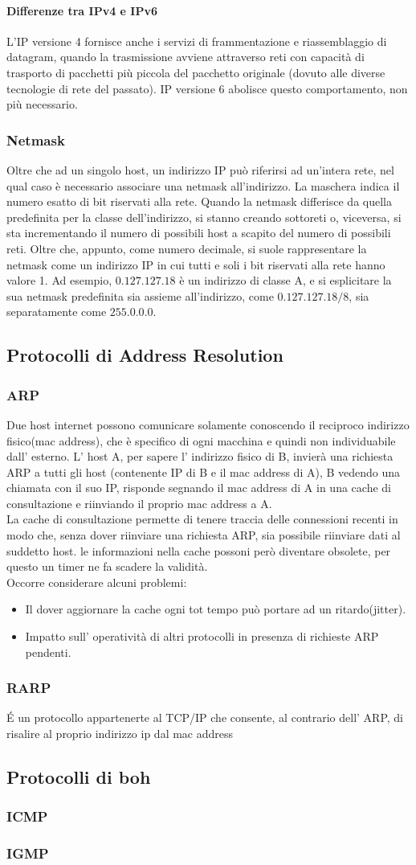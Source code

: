 \documentclass[a4paper,11pt]{article}
\def\sub#1{\subsection{#1}\label{#1}}
\def\subsub#1{\subsubsection{#1}\label{#1}}
\begin{document}
\paragraph{Differenze tra IPv4 e IPv6}
L’IP versione 4 fornisce anche i servizi di frammentazione e riassemblaggio di datagram, quando la trasmissione avviene attraverso reti con capacità di trasporto di pacchetti più piccola del pacchetto originale (dovuto alle diverse tecnologie di rete del passato). IP versione 6 abolisce questo comportamento, non più necessario. %
\subsub{Netmask} Oltre che ad un singolo host, un indirizzo IP può riferirsi ad un'intera rete, nel qual caso è necessario associare una netmask all'indirizzo. La maschera indica il numero esatto di bit riservati alla rete. Quando la netmask differisce da quella predefinita per la classe dell'indirizzo, si stanno creando sottoreti o, viceversa, si sta incrementando il numero di possibili host a scapito del numero di possibili reti. Oltre che, appunto, come numero decimale, si suole rappresentare la netmask come un indirizzo IP in cui tutti e soli i bit riservati alla rete hanno valore 1. Ad esempio, $0.127.127.18$ è un indirizzo di classe A, e si esplicitare la sua netmask predefinita sia assieme all'indirizzo, come $0.127.127.18/8$, sia separatamente come $255.0.0.0$.

\subsection{Protocolli di Address Resolution} 
\subsub{ARP}
Due host internet possono comunicare solamente conoscendo il reciproco indirizzo fisico(mac address), che è specifico di ogni macchina e quindi non individuabile dall' esterno.
L' host A, per sapere l' indirizzo fisico di B, invierà una richiesta ARP a tutti gli host (contenente IP di B e il mac address di A), B vedendo una chiamata con il suo IP, risponde segnando il mac address di A in una cache di consultazione e riinviando il proprio mac address a A.\\
La cache di consultazione permette di tenere traccia delle connessioni recenti in modo che, senza dover riinviare una richiesta ARP, sia possibile riinviare dati al suddetto host. le informazioni nella cache possoni però diventare obsolete, per questo un timer ne fa scadere la validità.\\
Occorre considerare alcuni problemi:\\
\begin {itemize}
\item Il dover aggiornare la cache ogni tot tempo può portare ad un ritardo(jitter).\\
\item Impatto sull' operatività di altri protocolli in presenza di richieste ARP pendenti.\\
\end{itemize}
\subsub{RARP}
\'E un protocollo appartenerte al TCP/IP che consente, al contrario dell' ARP, di risalire al proprio indirizzo ip dal mac address
\sub{Protocolli di boh}
\subsub{ICMP} 
\subsub{IGMP}
\end{document}
